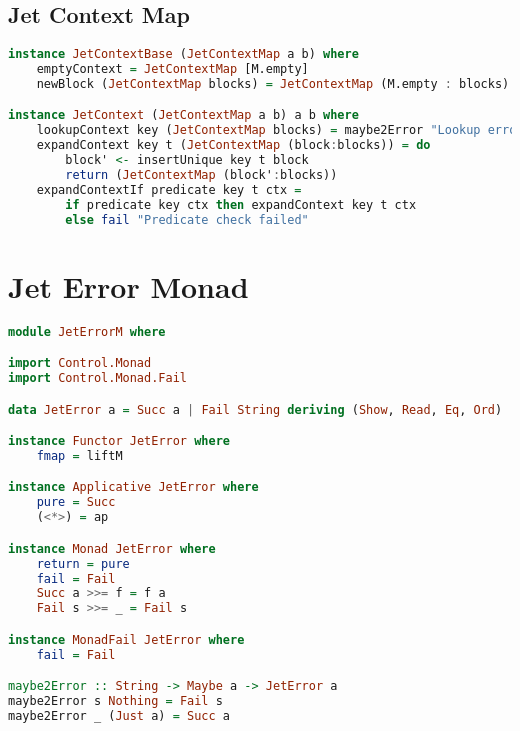 \subsection{Jet Context Map}
\begin{lstlisting}[language=Haskell]
instance JetContextBase (JetContextMap a b) where
    emptyContext = JetContextMap [M.empty]
    newBlock (JetContextMap blocks) = JetContextMap (M.empty : blocks)

instance JetContext (JetContextMap a b) a b where
    lookupContext key (JetContextMap blocks) = maybe2Error "Lookup error" $ M.lookup key (M.unions blocks)
    expandContext key t (JetContextMap (block:blocks)) = do
        block' <- insertUnique key t block
        return (JetContextMap (block':blocks))
    expandContextIf predicate key t ctx = 
        if predicate key ctx then expandContext key t ctx
        else fail "Predicate check failed"
\end{lstlisting}
\section{Jet Error Monad}
\begin{lstlisting}[language=Haskell]
module JetErrorM where

import Control.Monad
import Control.Monad.Fail

data JetError a = Succ a | Fail String deriving (Show, Read, Eq, Ord)

instance Functor JetError where
    fmap = liftM

instance Applicative JetError where
    pure = Succ
    (<*>) = ap

instance Monad JetError where
    return = pure
    fail = Fail
    Succ a >>= f = f a
    Fail s >>= _ = Fail s

instance MonadFail JetError where
    fail = Fail

maybe2Error :: String -> Maybe a -> JetError a
maybe2Error s Nothing = Fail s
maybe2Error _ (Just a) = Succ a
\end{lstlisting}